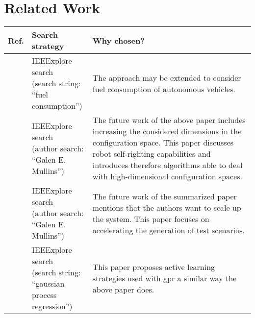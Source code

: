 \documentclass[oneside, notitlepage, twocolumn]{scrartcl}
\newcommand{\tableheadline}[1]{\textbf{#1}}
\begin{document}
\section{Related Work}
\begin{adjustbox}{angle=90}
\begin{tabularx}{\textwidth}{llX}
    \tableheadline{Ref.} & \tableheadline{Search strategy} & \tableheadline{Why chosen?}\\
    \midrule
    \cite{trucksFuel} & \makecell{IEEExplore search\\(search string:\\``fuel consumption'')} & The approach may be extended to consider fuel consumption of autonomous vehicles.\\
    \midrule
    \cite{higherDims} & \makecell{IEEExplore search\\(author search:\\``Galen E. Mullins'')}& The future work of the above paper includes increasing the considered dimensions in the configuration space.
        This paper discusses robot self-righting capabilities and introduces therefore algorithms able to deal with high-dimensional configuration spaces.\\
    \midrule
    \cite{accelerate} & \makecell{IEEExplore search\\(author search:\\``Galen E. Mullins'')} & The future work of the summarized paper mentions that the authors want to scale up the system.
    This paper focuses on accelerating the generation of test scenarios.\\
    \midrule
    \cite{gpr} & \makecell{IEEExplore search\\(search string:\\``gaussian process\\regression'')}& This paper proposes active learning strategies used with \gls{gpr} a similar way the above paper does.\\
\end{tabularx}
\end{adjustbox}
\end{document}
